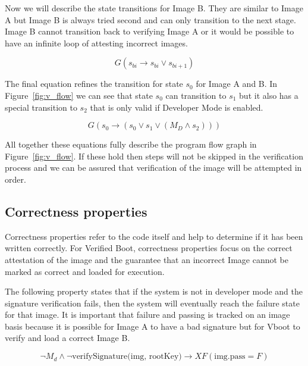 Now we will describe the state transitions for Image B. 
They are similar to Image A but Image B is always tried second and can only transition to the next stage. 
Image B cannot transition back to verifying Image A or it would be possible to have an infinite loop of attesting incorrect images.

\begin{equation}
    G(s_{bi} \to s_{bi} \lor s_{bi+1})
\end{equation}

The final equation refines the transition for state $s_0$ for Image A and B.
In Figure~\ref{fig:v_flow} we can see that state $s_0$ can transition to $s_1$ but it also has a special transition to $s_2$ that is only valid if Developer Mode is enabled.

\begin{equation}
    G(s_0 \to (s_0 \lor s_{1} \lor (M_D \land s_{2})))
\end{equation}

All together these equations fully describe the program flow graph in Figure~\ref{fig:v_flow}. 
If these hold then steps will not be skipped in the verification process and we can be assured that verification of the image will be attempted in order.

\subsection{Correctness properties}

Correctness properties refer to the code itself and help to determine if it has been written correctly.
For Verified Boot, correctness properties focus on the correct attestation of the image and the guarantee that an incorrect Image cannot be marked as correct and loaded for execution.

The following property states that if the system is not in developer mode and the signature verification fails, then the system will eventually reach the failure state for that image.
It is important that failure and passing is tracked on an image basis because it is possible for Image A to have a bad signature but for Vboot to verify and load a correct Image B.

\begin{equation} \label{eq:sig_cor}
 \lnot M_d \land \lnot \text{verifySignature(img, rootKey)} \to XF (\text{img.pass} = F)
\end{equation}

